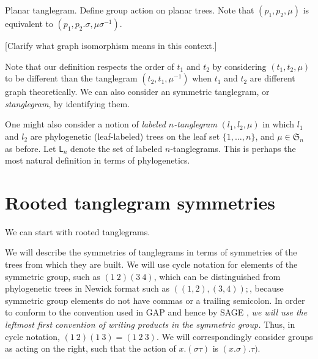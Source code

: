 \documentclass{amsart}
\newcommand{\fS}{\mathfrak S}
\newcommand{\pairing}{\mu}
\newcommand{\ltangle}{\mathsf{L}}
\begin{document}
Planar tanglegram.
Define group action on planar trees.
Note that $(p_1, p_2, \pairing)$ is equivalent to $(p_1, p_2 . \sigma, \pairing \sigma^{-1})$.

[Clarify what graph isomorphism means in this context.]

Note that our definition respects the order of $t_1$ and $t_2$ by considering $(t_1, t_2, \pairing)$ to be different than the tanglegram $(t_2, t_1, \pairing^{-1})$ when $t_1$ and $t_2$ are different graph theoretically.
We can also consider an symmetric tanglegram, or \emph{stanglegram}, by identifying them.

One might also consider a notion of \emph{labeled $n$-tanglegram} $(l_1, l_2, \pairing)$ in which $l_1$ and $l_2$ are phylogenetic (leaf-labeled) trees on the leaf set $\{1, \ldots, n\}$, and $\pairing \in \fS_n$ as before.
Let $\ltangle_n$ denote the set of labeled $n$-tanglegrams.
This is perhaps the most natural definition in terms of phylogenetics.


\section{Rooted tanglegram symmetries}
We can start with rooted tanglegrams.

We will describe the symmetries of tanglegrams in terms of symmetries of the trees from which they are built.
We will use cycle notation for elements of the symmetric group, such as $(1\ 2) (3\ 4)$, which can be distinguished from phylogenetic trees in Newick format \cite{wiki:newick} such as $((1,2),(3,4));$, because symmetric group elements do not have commas or a trailing semicolon.
In order to conform to the convention used in GAP \cite{GAP4} and hence by SAGE \cite{SteinJoyner2005}, \emph{we will use the leftmost first convention of writing products in the symmetric group.}
Thus, in cycle notation, $(1\ 2) (1\ 3) = (1\ 2\ 3)$.
We will correspondingly consider groups as acting on the right, such that the action of $x.(\sigma \tau)$ is $(x.\sigma) . \tau)$.
\end{document}
